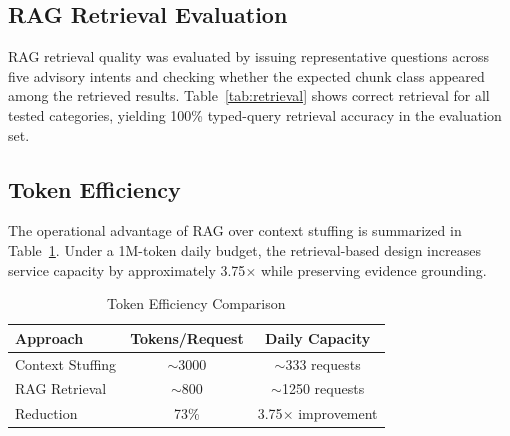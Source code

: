 \documentclass[conference]{IEEEtran}
\begin{document}
\subsection{RAG Retrieval Evaluation}
RAG retrieval quality was evaluated by issuing representative questions across five advisory intents and checking whether the expected chunk class appeared among the retrieved results. Table~\ref{tab:retrieval} shows correct retrieval for all tested categories, yielding 100\% typed-query retrieval accuracy in the evaluation set.

\begin{table}[t]
\caption{RAG Retrieval Evaluation}
\label{tab:retrieval}
\centering
{}
\end{table}

\subsection{Token Efficiency}
The operational advantage of RAG over context stuffing is summarized in Table~\ref{tab:tokens}. Under a 1M-token daily budget, the retrieval-based design increases service capacity by approximately 3.75$\times$ while preserving evidence grounding.

\begin{table}[t]
\caption{Token Efficiency Comparison}
\label{tab:tokens}
\centering
\begin{tabular}{lcc}
\toprule
Approach & Tokens/Request & Daily Capacity \\
\midrule
Context Stuffing & $\sim$3000 & $\sim$333 requests \\
RAG Retrieval & $\sim$800 & $\sim$1250 requests \\
Reduction & 73\% & 3.75$\times$ improvement \\
\bottomrule
\end{tabular}
\end{table}
\end{document}
